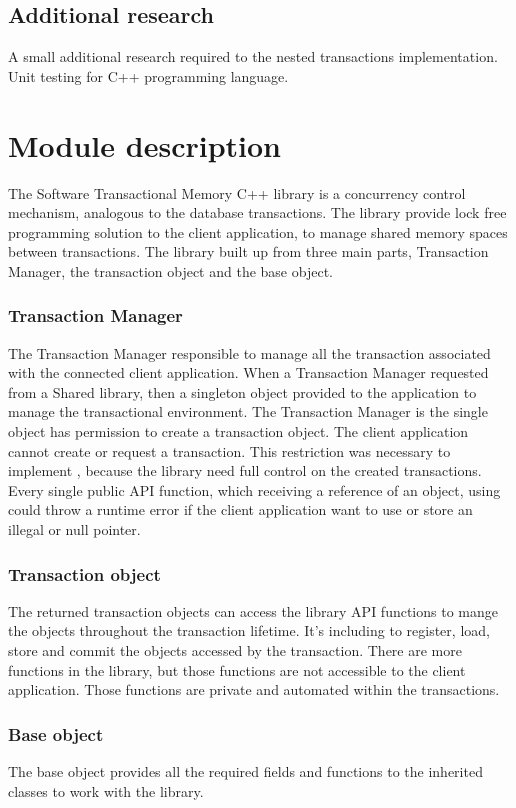 \documentclass[12pt]{article}
\begin{document}
\subsection{Additional research}
A small additional research required to the nested transactions implementation.\\
Unit testing for C++ programming language.\cite{cookbook}

\section{Module description}
The Software Transactional Memory C++ library is a concurrency control mechanism, analogous to the database transactions. The library provide lock free programming solution to the client application, to manage shared memory spaces between transactions. The library built up from three main parts, Transaction Manager, the transaction object and the base object. 


\subsubsection{Transaction Manager}
The Transaction Manager responsible to manage all the transaction associated with the connected client application. When a Transaction Manager requested from a Shared library, then a singleton object provided to the application to manage the transactional environment. The Transaction Manager is the single object has permission to create a transaction object. The client application cannot create or request a transaction. This restriction was necessary to implement , because the library need full control on the created transactions. Every single public API function, which receiving a reference of an object, using could throw a runtime error if the client application want to use or store an illegal or null pointer.
\subsubsection{Transaction object}
The returned transaction objects can access the library API functions to mange the objects throughout the transaction lifetime. It's including to register, load, store and commit the objects accessed by the transaction. There are more functions in the library, but those functions are not accessible to the client application. Those functions are private and automated within the transactions.   
\subsubsection{Base object}
The base object provides all the required fields and functions to the inherited classes to work with the library.
\end{document}

